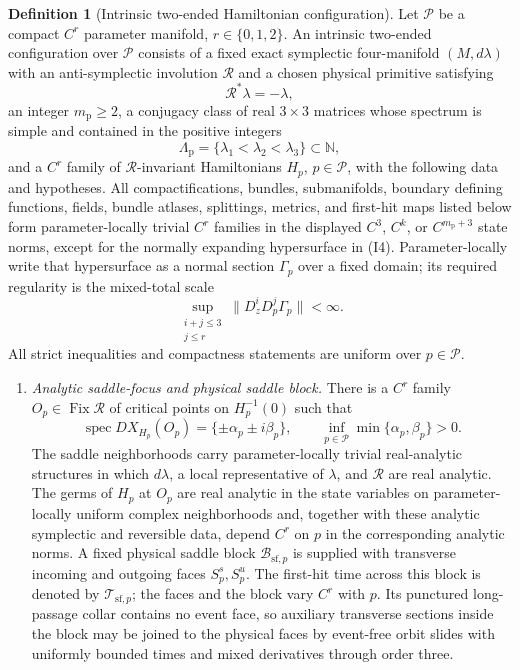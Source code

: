 \documentclass[11pt]{amsart}
\numberwithin{equation}{section}
\theoremstyle{definition}
\newtheorem{definition}[theorem]{Definition}
\theoremstyle{remark}
\newcommand{\Fix}{\operatorname {Fix}}
\newcommand{\spec}{\operatorname {spec}}
\begin{document}
\begin{definition}[Intrinsic two-ended Hamiltonian configuration]
\label{def:intrinsic-two-end-data}
Let $\mathcal P$ be a compact $C^r$ parameter manifold,
$r\in\{0,1,2\}$.  An intrinsic two-ended configuration over $\mathcal P$
consists of a fixed exact symplectic four-manifold $(M,d\lambda)$ with an
anti-symplectic involution $\mathcal R$ and a chosen physical primitive
satisfying
\[
 \mathcal R^*\lambda=-\lambda,
\]
an integer $m_{\mathrm p}\ge2$, a conjugacy class of real
$3\times3$ matrices whose spectrum is simple and contained in the positive
integers
\begin{equation}\label{eq:intrinsic-pole-spectrum}
 \Lambda_{\mathrm p}=\{\lambda_1<\lambda_2<\lambda_3\}
 \subset\mathbb N,
\end{equation}
and a $C^r$ family of
$\mathcal R$-invariant Hamiltonians $H_p$, $p\in\mathcal P$, with the
following data and hypotheses.
All compactifications, bundles, submanifolds, boundary defining functions,
fields, bundle atlases, splittings, metrics, and first-hit maps listed below
form parameter-locally trivial $C^r$ families in the displayed $C^3$,
$C^k$, or $C^{m_{\mathrm p}+3}$ state norms, except for the normally expanding
hypersurface in \textup{(I4)}.  Parameter-locally write that hypersurface
as a normal section $\Gamma_p$ over a fixed domain; its required regularity
is the mixed-total scale
\begin{equation}\label{eq:intrinsic-algebraic-mixed-regularity}
 \sup_{\substack{i+j\le3\\j\le r}}
 \|D_z^iD_p^j\Gamma_p\|<\infty.
\end{equation}
All strict inequalities and
compactness statements are uniform over $p\in\mathcal P$.
\begin{enumerate}
\renewcommand{\labelenumi}{\textup{(I\arabic{enumi})}}
\item \emph{Analytic saddle-focus and physical saddle block.}
There is a $C^r$ family $O_p\in\Fix\mathcal R$ of critical points on
$H_p^{-1}(0)$ such that
\[
 \spec DX_{H_p}(O_p)=\{\pm\alpha_p\pm i\beta_p\},
 \qquad
 \inf_{p\in\mathcal P}\min\{\alpha_p,\beta_p\}>0.
\]
The saddle neighborhoods carry parameter-locally trivial real-analytic
structures in which $d\lambda$, a local representative of $\lambda$, and
$\mathcal R$ are real analytic.  The germs of $H_p$ at $O_p$ are real
analytic in the state variables on parameter-locally uniform complex
neighborhoods and, together with these analytic symplectic and reversible
data, depend $C^r$ on $p$ in the corresponding analytic norms.  A fixed physical saddle block
$\mathcal B_{\mathrm{sf},p}$ is supplied with transverse incoming and
outgoing faces $S^s_p,S^u_p$.  The first-hit time across this block is
denoted by $\mathcal T_{\mathrm{sf},p}$; the faces and the block vary
$C^r$ with $p$.  Its punctured long-passage collar contains no event face,
so auxiliary transverse sections inside the block may be joined to the
physical faces by event-free orbit slides with uniformly bounded times and
mixed derivatives through order three.


\end{enumerate}
\end{definition}
\end{document}

